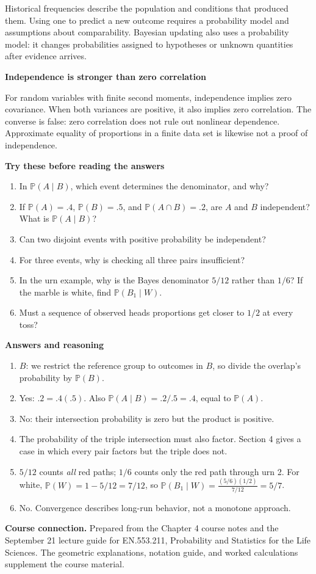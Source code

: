 \documentclass[11pt,letterpaper]{article}
\newcommand{\Pp}{\mathbb{P}}
\newcommand{\minihead}[1]{\par\smallskip\textbf{\color{ink}#1}\par}
\begin{document}
Historical frequencies describe the population and conditions that produced them. Using one to predict a new outcome requires a probability model and assumptions about comparability. Bayesian updating also uses a probability model: it changes probabilities assigned to hypotheses or unknown quantities after evidence arrives.

\minihead{Independence is stronger than zero correlation}
For random variables with finite second moments, independence implies zero covariance. When both variances are positive, it also implies zero correlation. The converse is false: zero correlation does not rule out nonlinear dependence. Approximate equality of proportions in a finite data set is likewise not a proof of independence.

\minihead{Try these before reading the answers}
\begin{enumerate}[itemsep=5pt]
\item In $\Pp(A\mid B)$, which event determines the denominator, and why?
\item If $\Pp(A)=.4$, $\Pp(B)=.5$, and $\Pp(A\cap B)=.2$, are $A$ and $B$ independent? What is $\Pp(A\mid B)$?
\item Can two disjoint events with positive probability be independent?
\item For three events, why is checking all three pairs insufficient?
\item In the urn example, why is the Bayes denominator $5/12$ rather than $1/6$? If the marble is white, find $\Pp(B_1\mid W)$.
\item Must a sequence of observed heads proportions get closer to $1/2$ at every toss?
\end{enumerate}

\minihead{Answers and reasoning}
\begin{enumerate}[itemsep=5pt]
\item $B$: we restrict the reference group to outcomes in $B$, so divide the overlap's probability by $\Pp(B)$.
\item Yes: $.2=.4(.5)$. Also $\Pp(A\mid B)=.2/.5=.4$, equal to $\Pp(A)$.
\item No: their intersection probability is zero but the product is positive.
\item The probability of the triple intersection must also factor. Section 4 gives a case in which every pair factors but the triple does not.
\item $5/12$ counts \emph{all} red paths; $1/6$ counts only the red path through urn 2. For white, $\Pp(W)=1-5/12=7/12$, so
$\Pp(B_1\mid W)=\frac{(5/6)(1/2)}{7/12}=5/7$.
\item No. Convergence describes long-run behavior, not a monotone approach.
\end{enumerate}

\vfill
{\footnotesize\textbf{Course connection.} Prepared from the Chapter 4 course notes and the September 21 lecture guide for EN.553.211, Probability and Statistics for the Life Sciences. The geometric explanations, notation guide, and worked calculations supplement the course material.}
\end{document}
